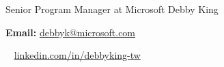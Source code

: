 \cventry
  {Senior Program Manager at Microsoft} %
  {Debby King} %
  {} %
  {} %
  {
    \begin{cvitems}
      \item {\textbf{Email:} \href{mailto:debbyk@microsoft.com}{debbyk@microsoft.com}}
      \item {\textbf{\faLinkedin\ } \href{https://www.linkedin.com/in/debbyking-tw}{linkedin.com/in/debbyking-tw}}
    \end{cvitems}
  }